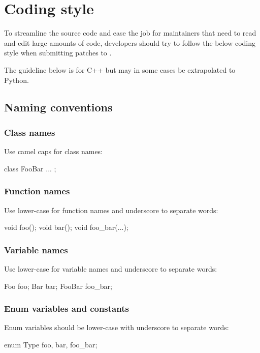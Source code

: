 \chapter{Coding style}
\label{sec:codingstyle}

To streamline the \dolfin{} source code and ease the job for
maintainers that need to read and edit large amounts of code,
developers should try to follow the below coding style when submitting
patches to \dolfin{}.

The guideline below is for C++ but may in some cases be extrapolated
to Python.

\section{Naming conventions}

\subsection{Class names}

Use camel caps for class names:
\begin{code}
class FooBar
{
  ...
};
\end{code}

\subsection{Function names}

Use lower-case for function names and underscore to separate words:
\begin{code}
void foo();
void bar();
void foo_bar(...);
\end{code}

\subsection{Variable names}

Use lower-case for variable names and underscore to separate words:
\begin{code}
Foo foo;
Bar bar;
FooBar foo_bar;
\end{code}

\subsection{Enum variables and constants}

Enum variables should be lower-case with underscore to separate words:
\begin{code}
enum Type {foo, bar, foo_bar};
\end{code}

